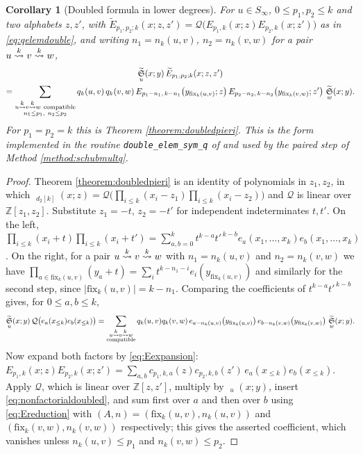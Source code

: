 \documentclass{amsart}
\newtheorem{corollary}[lemma]{Corollary}
\theoremstyle{definition}
\theoremstyle{remark}
\numberwithin{equation}{section}
\DeclareMathOperator{\qsch}{\widetilde{\mathfrak{S}}}
\newcommand{\xrightsquigarrow}[2][]{%
	\mathrel{\mathop{\rightsquigarrow}\limits^{\scriptstyle #2}%
	\ifx\hfuzz#1\hfuzz\else_{\scriptstyle #1}\fi}%
}
\newcommand{\tom}[1]{\ensuremath{\xrightsquigarrow{#1}}}
\newcommand{\fx}{\mathrm{fix}}
\newcommand{\qelem}{\widetilde{E}}
\begin{document}
\begin{corollary}[Doubled formula in lower degrees] \label{corollary:lowerdegrees}
For $u\in S_\infty$, $0\leq p_1,p_2\leq k$ and two alphabets $z,z'$, with $\qelem_{p_1,p_2;k}(x;z,z')=\mathcal Q\big(E_{p_1,k}(x;z)E_{p_2,k}(x;z')\big)$ as in \eqref{eq:qelemdouble}, and writing $n_1=n_k(u,v)$, $n_2=n_k(v,w)$ for a pair $u\tom kv\tom kw$,
\begin{multline*}
\qsch_u(x;y)\,\qelem_{p_1,p_2;k}(x;z,z')\\
=\sum_{\substack{u\tom{k}v\tom{k}w\ \text{compatible}\\ n_1\leq p_1,\ n_2\leq p_2}}q_k(u,v)\,q_k(v,w)\,E_{p_1-n_1,\,k-n_1}\big(y_{\fx_k(u,v)};z\big)\,E_{p_2-n_2,\,k-n_2}\big(y_{\fx_k(v,w)};z'\big)\,\qsch_w(x;y).
\end{multline*} For $p_1=p_2=k$ this is Theorem \ref{theorem:doubledpieri}. This is the form implemented in the routine \texttt{double\_elem\_sym\_q} of \cite{schubmult} and used by the paired step of Method \ref{method:schubmultq}.
\end{corollary}
\begin{proof}
Theorem \ref{theorem:doubledpieri} is an identity of polynomials in $z_1,z_2$, in which $\qsch_{d_2[k]}(x;z)=\mathcal Q\big(\prod_{i\leq k}(x_i-z_1)\prod_{i\leq k}(x_i-z_2)\big)$ and $\mathcal Q$ is linear over $\mathbb Z[z_1,z_2]$. Substitute $z_1=-t$, $z_2=-t'$ for independent indeterminates $t,t'$. On the left, $\prod_{i\leq k}(x_i+t)\prod_{i\leq k}(x_i+t')=\sum_{a,b=0}^kt^{k-a}t'^{\,k-b}e_a(x_1,\ldots,x_k)e_b(x_1,\ldots,x_k)$. On the right, for a pair $u\tom kv\tom kw$ with $n_1=n_k(u,v)$ and $n_2=n_k(v,w)$ we have $\prod_{a\in\fx_k(u,v)}(y_a+t)=\sum_it^{k-n_1-i}e_i(y_{\fx_k(u,v)})$ and similarly for the second step, since $|\fx_k(u,v)|=k-n_1$. Comparing the coefficients of $t^{k-a}t'^{\,k-b}$ gives, for $0\leq a,b\leq k$,
\begin{equation}\label{eq:nonfactorialdoubled}
\qsch_u(x;y)\,\mathcal Q\big(e_a(x_{\leq k})e_b(x_{\leq k})\big)=\sum_{\substack{u\tom kv\tom kw\\\text{compatible}}}q_k(u,v)q_k(v,w)\,e_{a-n_k(u,v)}\big(y_{\fx_k(u,v)}\big)\,e_{b-n_k(v,w)}\big(y_{\fx_k(v,w)}\big)\,\qsch_w(x;y).
\end{equation}
Now expand both factors by \eqref{eq:Eexpansion}: $E_{p_1,k}(x;z)E_{p_2,k}(x;z')=\sum_{a,b}c_{p_1,k,a}(z)c_{p_2,k,b}(z')\,e_a(x_{\leq k})e_b(x_{\leq k})$. Apply $\mathcal Q$, which is linear over $\mathbb Z[z,z']$, multiply by $\qsch_u(x;y)$, insert \eqref{eq:nonfactorialdoubled}, and sum first over $a$ and then over $b$ using \eqref{eq:Ereduction} with $(A,n)=(\fx_k(u,v),n_k(u,v))$ and $(\fx_k(v,w),n_k(v,w))$ respectively; this gives the asserted coefficient, which vanishes unless $n_k(u,v)\leq p_1$ and $n_k(v,w)\leq p_2$.
\end{proof}
\end{document}
